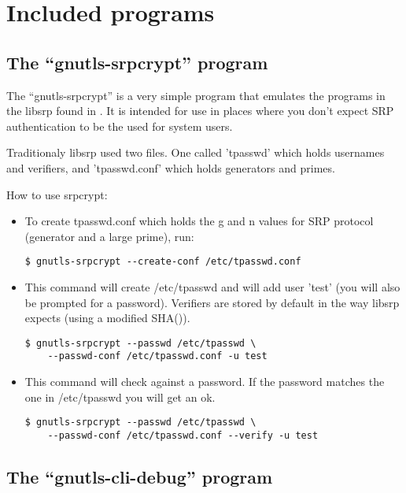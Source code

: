 \chapter{Included programs}

\section{The ``gnutls-srpcrypt'' program}
\label{srpcrypt}

The ``gnutls-srpcrypt'' is a very simple program that emulates the programs in the libsrp 
found in .
It is intended for use in places where you don't expect SRP
authentication to be the used for system users.

Traditionaly libsrp used two files. One called 'tpasswd' which holds usernames 
and verifiers, and 'tpasswd.conf' which holds generators and primes.
\par
How to use srpcrypt:

\begin{itemize}


\item To create tpasswd.conf which holds the g and n values for
SRP protocol (generator and a large prime), run:
\begin{verbatim}
$ gnutls-srpcrypt --create-conf /etc/tpasswd.conf
\end{verbatim}


\item This command will create /etc/tpasswd and will add user 'test' (you will also
be prompted for a password). Verifiers are stored by default in the
way libsrp expects (using a modified SHA()). 
\begin{verbatim}
$ gnutls-srpcrypt --passwd /etc/tpasswd \ 
    --passwd-conf /etc/tpasswd.conf -u test
\end{verbatim}

\item This command will check against a password. If the password matches 
the one in /etc/tpasswd you will get an ok.
\begin{verbatim}
$ gnutls-srpcrypt --passwd /etc/tpasswd \ 
    --passwd-conf /etc/tpasswd.conf --verify -u test
\end{verbatim}

\end{itemize}



\section{The ``gnutls-cli-debug'' program}

